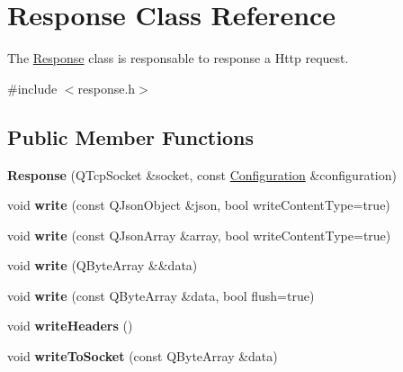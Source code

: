 \hypertarget{class_response}{}\section{Response Class Reference}
\label{class_response}


The \hyperlink{class_response}{Response} class is responsable to response a Http request.  




{\ttfamily \#include $<$response.\+h$>$}

\subsection*{Public Member Functions}
\begin{DoxyCompactItemize}
\item 
\mbox{\label{class_response_a199c4da036e1bea08eb0693140b8a4e0}} 
{\bfseries Response} (Q\+Tcp\+Socket \&socket, const \hyperlink{class_configuration}{Configuration} \&configuration)
\item 
\mbox{\label{class_response_abe45c271ceff4711972d44029d7aca0a}} 
void {\bfseries write} (const Q\+Json\+Object \&json, bool write\+Content\+Type=true)
\item 
\mbox{\label{class_response_aebe6eaba08522c944ad5f05131d0b55b}} 
void {\bfseries write} (const Q\+Json\+Array \&array, bool write\+Content\+Type=true)
\item 
\mbox{\label{class_response_a597628c77d25f5f71708bda977daf5bf}} 
void {\bfseries write} (Q\+Byte\+Array \&\&data)
\item 
\mbox{\label{class_response_a438b172ba3b22cfebe453879fbb043f4}} 
void {\bfseries write} (const Q\+Byte\+Array \&data, bool flush=true)
\item 
\mbox{\label{class_response_af336860cc3e3d6b96c257a1845ec5e48}} 
void {\bfseries write\+Headers} ()
\item 
\mbox{\label{class_response_a48dda4add1343ce41fb7c7e2a891b20f}} 
void {\bfseries write\+To\+Socket} (const Q\+Byte\+Array \&data)
\item 

\end{DoxyCompactItemize}
